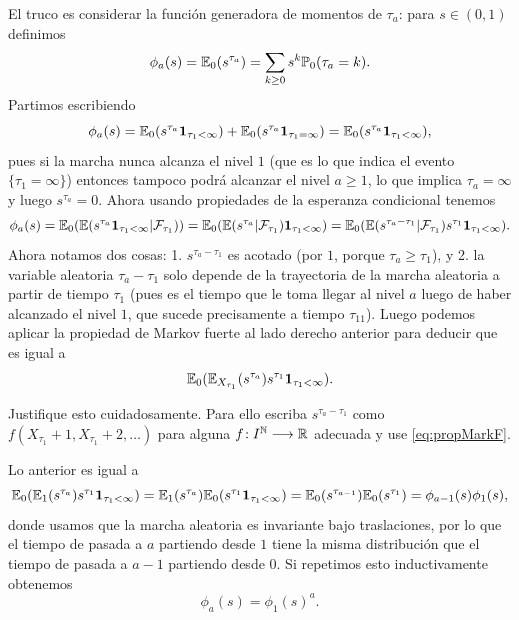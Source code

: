 El truco es considerar la función generadora de momentos de $\tau_a$: para $s\in(0,1)$ definimos
\begin{equation}\label{eq:phia}
\phi_a(s)=\mathbb{E}_0(s^{\tau_a})=\sum_{k\geq0}s^k\mathbb{P}_0(\tau_a=k).
\end{equation}
Partimos escribiendo
\[\phi_a(s)=\mathbb{E}_0(s^{\tau_a}\mathbf{1}_{\tau_1<\infty})+\mathbb{E}_0(s^{\tau_a}\mathbf{1}_{\tau_1=\infty})=\mathbb{E}_0(s^{\tau_a}\mathbf{1}_{\tau_1<\infty}),\]
pues si la marcha nunca alcanza el nivel $1$ (que es lo que indica el evento $\{\tau_1=\infty\}$) entonces tampoco podrá alcanzar el nivel $a\geq1$, lo que implica $\tau_a=\infty$ y luego $s^{\tau_a}=0$.
Ahora usando propiedades de la esperanza condicional tenemos
\[\phi_a(s)=\mathbb{E}_0(\mathbb{E}(s^{\tau_a}\mathbf{1}_{\tau_1<\infty}|\mathcal{F}_{\tau_1}))=\mathbb{E}_0(\mathbb{E}(s^{\tau_a}|\mathcal{F}_{\tau_1})\mathbf{1}_{\tau_1<\infty})=\mathbb{E}_0(\mathbb{E}(s^{\tau_a-\tau_1}|\mathcal{F}_{\tau_1})s^{\tau_1}\mathbf{1}_{\tau_1<\infty}).\]
Ahora notamos dos cosas: 1. $s^{\tau_a-\tau_1}$ es acotado (por $1$, porque $\tau_a\geq\tau_1$), y 2. la variable aleatoria $\tau_a-\tau_1$ solo depende de la trayectoria de la marcha aleatoria a partir de tiempo $\tau_1$ (pues es el tiempo que le toma llegar al nivel $a$ luego de haber alcanzado el nivel $1$, que sucede precisamente a tiempo $\tau_11$).
Luego podemos aplicar la propiedad de Markov fuerte al lado derecho anterior para deducir que es igual a
\[\mathbb{E}_0(\mathbb{E}_{X_{\tau_1}}(s^{\tau_a})s^{\tau_1}\mathbf{1}_{\tau_1<\infty}).\]

\begin{exer}
Justifique esto cuidadosamente.
Para ello escriba $s^{\tau_a-\tau_1}$ como $f(X_{\tau_1}+1,X_{\tau_1}+2,\dotsc)$ para alguna $f\!:I^{\mathbb{N}}\longrightarrow\mathbb{R}$ adecuada y use \eqref{eq:propMarkF}.
\end{exer}

Lo anterior es igual a
\[\mathbb{E}_0(\mathbb{E}_{1}(s^{\tau_a})s^{\tau_1}\mathbf{1}_{\tau_1<\infty})=\mathbb{E}_{1}(s^{\tau_a})\mathbb{E}_0(s^{\tau_1}\mathbf{1}_{\tau_1<\infty})=\mathbb{E}_{0}(s^{\tau_{a-1}})\mathbb{E}_0(s^{\tau_1})=\phi_{a-1}(s)\phi_1(s),\]
donde usamos que la marcha aleatoria es invariante bajo traslaciones, por lo que el tiempo de pasada a $a$ partiendo desde $1$ tiene la misma distribución que el tiempo de pasada a $a-1$ partiendo desde $0$.
Si repetimos esto inductivamente obtenemos 
\[\phi_a(s)=\phi_1(s)^a.\]

